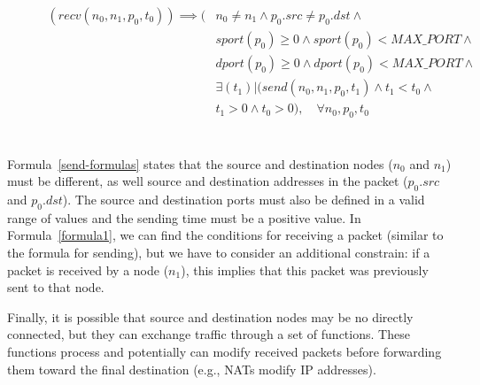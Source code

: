 \begin{figure}[h]
		{\footnotesize
			\begin{equation}
					\begin{split}
 					    (recv(n_{0}, n_{1}, p_{0}, t_{0})) \implies (& n_{0} \neq n_{1} \wedge p_{0}.src \neq p_{0}.dst \wedge \\
 					    & sport(p_{0}) \geq 0 \wedge sport(p_{0}) < MAX\_PORT \wedge \\
 					    & dport(p_{0}) \geq 0 \wedge dport(p_{0}) < MAX\_PORT \wedge \\
 					    &\exists (t_{1}) | (send(n_{0}, n_{1}, p_{0}, t_{1}) \wedge t_{1} < t_{0} \wedge \\
 					    & t_{1} > 0 \wedge t_{0} > 0 ), \quad \forall n_{0}, p_{0}, t_{0} \\
					\end{split}
				\label{formula1}
			\end{equation}}
\end{figure} 
\\
Formula~\ref{send-formulas} states that the source and destination nodes (\textit{$n_0$} and \textit{$n_1$}) must be different, as well source and destination addresses in the packet (\textit{$p_0.src$} and \textit{$p_0.dst$}). The source and destination ports must also be defined in a valid range of values and the sending time must be a positive value. In Formula~\ref{formula1}, we can find the conditions for receiving a packet (similar to the formula for sending), but we have to consider an additional constrain: if a packet is received by a node (\textit{$n_1$}), this implies that this packet was previously sent to that node.   

Finally, it is possible that source and destination nodes may be no directly connected, but they can exchange traffic through a set of functions. These functions process and potentially can modify received packets before forwarding them toward the final destination (e.g., NATs modify IP addresses). 

